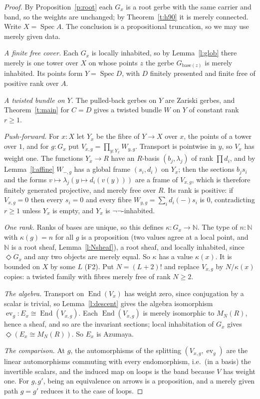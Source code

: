 \documentclass[11pt]{amsart}
\theoremstyle{definition}
\theoremstyle{remark}
\newcommand{\Spec}{\operatorname{Spec}}
\newcommand{\End}{\operatorname{End}}
\newcommand{\ev}{\operatorname{ev}}
\newcommand{\close}{\Diamond}
\newcommand{\Mat}{M_N(R)}
\newcommand{\N}{\mathbb N}
\begin{document}
\begin{proof}
By Proposition~\ref{p:root} each $G_x$ is a root gerbe with the same
carrier and band, so the weights are unchanged; by Theorem~\ref{t:h90} it
is merely connected. Write $X=\Spec A$. The conclusion is a propositional
truncation, so we may use merely given data.

\emph{A finite free cover.} Each $G_x$ is locally inhabited, so by
Lemma~\ref{l:glob} there merely is one tower over $X$ on whose points $z$
the gerbe $G_{\mathrm{base}(z)}$ is merely inhabited. Its points form
$Y=\Spec D$, with $D$ finitely presented and finite free of positive rank
over $A$.

\emph{A twisted bundle on $Y$.} The pulled-back gerbes on $Y$ are Zariski
gerbes, and Theorem~\ref{t:main} for $C=D$ gives a twisted bundle $W$ on
$Y$ of constant rank $r\geq1$.

\emph{Push-forward.} For $x:X$ let $Y_x$ be the fibre of $Y\to X$ over
$x$, the points of a tower over $1$, and for $g:G_x$ put
$V_{x,g}=\prod_{y:Y_x}W_{y,g}$. Transport is pointwise in $y$, so $V_x$
has weight one. The functions $Y_x\to R$ have an $R$-basis $(b_j,\lambda_j)$
of rank $\prod d_i$, and by Lemma~\ref{l:affine} $W_{-,g}$ has a global
frame $(s_i,d_i)$ on $Y_x$; then the sections $b_js_i$ and the forms
$v\mapsto\lambda_j(y\mapsto d_i(v(y)))$ are a frame of $V_{x,g}$, which is
therefore finitely generated projective, and merely free over $R$. Its rank
is positive: if $V_{x,g}=0$ then every $s_i=0$ and every fibre
$W_{y,g}=\sum_id_i(-)s_i$ is $0$, contradicting $r\geq1$ unless $Y_x$ is
empty, and $Y_x$ is $\neg\neg$-inhabited.

\emph{One rank.} Ranks of bases are unique, so this defines
$\kappa:G_x\to\N$. The type of $n:\N$ with $\kappa(g)=n$ for all $g$ is
a proposition (two values agree at a local point, and $\N$ is a root
sheaf, Lemma~\ref{l:Nsheaf}), a root sheaf, and locally inhabited, since
$\close G_x$ and any two objects are merely equal. So $\kappa$ has a
value $\kappa(x)$. It is bounded on $X$ by some $L$ (F2).
Put $N=(L+2)!$ and replace $V_{x,g}$ by $N/\kappa(x)$ copies: a twisted
family with fibres merely free of rank $N\geq2$.

\emph{The algebra.} Transport on $\End(V_x)$ has weight zero, since
conjugation by a scalar is trivial, so Lemma~\ref{l:descent} gives the
algebra isomorphism $\ev_g:E_x\cong\End(V_{x,g})$. Each $\End(V_{x,g})$ is
merely isomorphic to $\Mat$, hence a sheaf, and so are the invariant
sections; local inhabitation of $G_x$ gives $\close(E_x\cong\Mat)$. So
$E_x$ is Azumaya.

\emph{The comparison.} At $g$, the automorphisms of the splitting
$(V_{x,g},\ev_g)$ are the linear automorphisms commuting with every
endomorphism, i.e.\ (in a basis) the invertible scalars, and the induced
map on loops is the band because $V$ has weight one. For $g,g'$, being an
equivalence on arrows is a proposition, and a merely given path $g=g'$
reduces it to the case of loops.
\end{proof}
\end{document}
